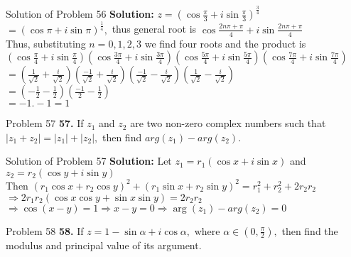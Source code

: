 \documentclass[aspectratio=169,8pt]{beamer}
\begin{document}
\begin{frame}{Solution of Problem 56}
  \textbf{Solution:} $z = \left(\cos\frac{\pi}{3} + i\sin\frac{\pi}{3}\right)^{\frac{3}{4}}$\\
  \vspace*{0.2cm}
  $= \left(\cos\pi + i\sin\pi\right)^{\frac{1}{4}},$ thus general root is $\cos\frac{2n\pi + \pi}{4} + i\sin\frac{2n\pi + \pi}{4}$\\
  \vspace*{0.2cm}
  Thus, substituting $n = 0, 1, 2, 3$ we find four roots and the product is\\
  \vspace*{0.2cm}
  $\left(\cos\frac{\pi}{4} + i\sin\frac{\pi}{4}\right)\left(\cos\frac{3\pi}{4} + i\sin\frac{3\pi}{4}\right)\left(\cos\frac{5\pi}{4} + i\sin\frac{5\pi}{4}\right)\left(\cos\frac{7\pi}{4} + i\sin\frac{7\pi}{4}\right)$\\
  \vspace*{0.2cm}
  $= \left(\frac{1}{\sqrt{2}} + \frac{i}{\sqrt{2}}\right)\left(\frac{-1}{\sqrt{2}} + \frac{i}{\sqrt{2}}\right)\left(\frac{-1}{\sqrt{2}} - \frac{i}{\sqrt{2}}\right)\left(\frac{1}{\sqrt{2}} - \frac{i}{\sqrt{2}}\right)$\\
  \vspace*{0.2cm}
  $= \left(-\frac{1}{2} - \frac{1}{2}\right)\left(\frac{-1}{2} - \frac{1}{2}\right)$\\
  \vspace*{0.2cm}
  $= -1.-1 = 1$
\end{frame}
\begin{frame}{Problem 57}
  \textbf{57.} If $z_1$ and $z_2$ are two non-zero complex numbers such that $|z_1 + z_2| = |z_1| + |z_2|,$ then find $arg(z_1) - arg(z_2).$
\end{frame}
\begin{frame}{Solution of Problem 57}
  \textbf{Solution:} Let $z_1 = r_1(\cos x + i\sin x)$ and $z_2 = r_2(\cos y + i\sin y)$\\
  \vspace*{0.2cm}
  Then $(r_1\cos x + r_2\cos y)^2 + (r_1\sin x+ r_2\sin y)^2 = r_1^2 + r_2^2 + 2r_2r_2$\\
  \vspace*{0.2cm}
  $\Rightarrow 2r_1r_2(\cos x\cos y + \sin x\sin y) = 2r_2r_2$\\
  \vspace*{0.2cm}
  $\Rightarrow \cos(x - y) = 1 \Rightarrow x - y = 0 \Rightarrow \arg(z_1) - arg(z_2) = 0$
\end{frame}
\begin{frame}{Problem 58}
  \textbf{58.} If $z = 1 - \sin\alpha + i\cos\alpha,$ where $\alpha\in\left(0, \frac{\pi}{2}\right),$ then find the modulus and principal value of its argument.
\end{frame}
\end{document}
